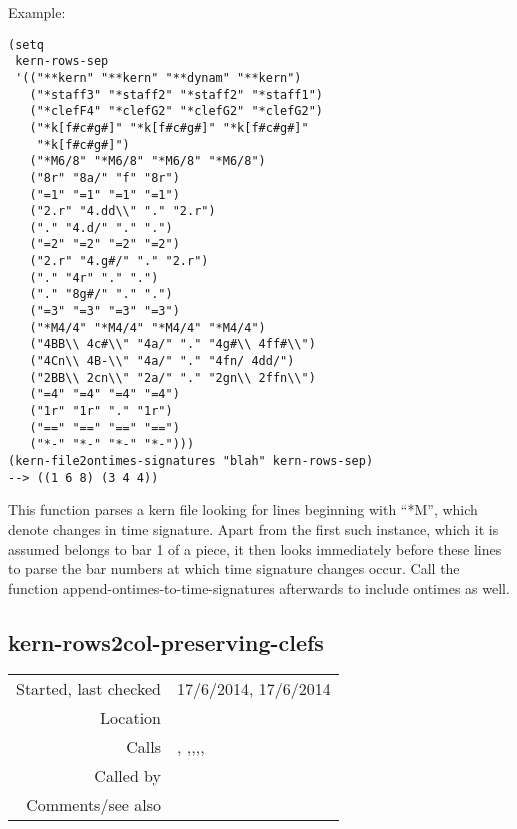 \vspace{0.5cm}
\noindent Example:
\begin{verbatim}
(setq
 kern-rows-sep
 '(("**kern" "**kern" "**dynam" "**kern")
   ("*staff3" "*staff2" "*staff2" "*staff1")
   ("*clefF4" "*clefG2" "*clefG2" "*clefG2")
   ("*k[f#c#g#]" "*k[f#c#g#]" "*k[f#c#g#]"
    "*k[f#c#g#]")
   ("*M6/8" "*M6/8" "*M6/8" "*M6/8")
   ("8r" "8a/" "f" "8r")
   ("=1" "=1" "=1" "=1")
   ("2.r" "4.dd\\" "." "2.r")
   ("." "4.d/" "." ".")
   ("=2" "=2" "=2" "=2")
   ("2.r" "4.g#/" "." "2.r")
   ("." "4r" "." ".")
   ("." "8g#/" "." ".")
   ("=3" "=3" "=3" "=3")
   ("*M4/4" "*M4/4" "*M4/4" "*M4/4")
   ("4BB\\ 4c#\\" "4a/" "." "4g#\\ 4ff#\\")
   ("4Cn\\ 4B-\\" "4a/" "." "4fn/ 4dd/")
   ("2BB\\ 2cn\\" "2a/" "." "2gn\\ 2ffn\\")
   ("=4" "=4" "=4" "=4")
   ("1r" "1r" "." "1r")
   ("==" "==" "==" "==")
   ("*-" "*-" "*-" "*-")))
(kern-file2ontimes-signatures "blah" kern-rows-sep)
--> ((1 6 8) (3 4 4))
\end{verbatim}

\noindent This function parses a kern file looking
for lines beginning with ``*M'', which denote
changes in time signature. Apart from the first such
instance, which it is assumed belongs to bar 1 of a
piece, it then looks immediately before these lines
to parse the bar numbers at which time signature
changes occur. Call the function
append-ontimes-to-time-signatures afterwards to
include ontimes as well.


\subsection*{kern-rows2col-preserving-clefs}\label{fun:kern-rows2col-preserving-clefs}

\vspace{0.3cm}
\begin{tabular}{r|p{8cm}}
Started, last checked & 17/6/2014, 17/6/2014 \\
Location & \nameref{sec:kern-to-staff-features} \\
Calls & \nameref{fun:fibonacci-list}, \nameref{fun:nth-list-of-lists},\newline \nameref{fun:space-bar-separated-string2list},\newline \nameref{fun:recognised-spine-commandp},\newline \nameref{fun:tab-separated-string2list},\newline \nameref{fun:update-staves-variable} \\
Called by & \nameref{fun:kern2clef-changes} \\
Comments/see also &
\end{tabular}


